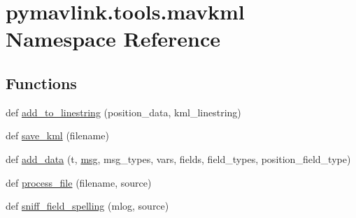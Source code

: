 \hypertarget{namespacepymavlink_1_1tools_1_1mavkml}{}\section{pymavlink.\+tools.\+mavkml Namespace Reference}
\label{namespacepymavlink_1_1tools_1_1mavkml}
\subsection*{Functions}
\begin{DoxyCompactItemize}
\item 
def \mbox{\hyperlink{namespacepymavlink_1_1tools_1_1mavkml_abf0b47cf026ca292449dfdc677ca6fd0}{add\+\_\+to\+\_\+linestring}} (position\+\_\+data, kml\+\_\+linestring)
\item 
def \mbox{\hyperlink{namespacepymavlink_1_1tools_1_1mavkml_a7ec121b5d220429cb465ea4f5a867b05}{save\+\_\+kml}} (filename)
\item 
def \mbox{\hyperlink{namespacepymavlink_1_1tools_1_1mavkml_a356af6d8a50929dbc97b578a26b02c89}{add\+\_\+data}} (t, \mbox{\hyperlink{stratnode_8cpp_a82cfe4ed9bc9e1b07c8bf209c324d85b}{msg}}, msg\+\_\+types, vars, fields, field\+\_\+types, position\+\_\+field\+\_\+type)
\item 
def \mbox{\hyperlink{namespacepymavlink_1_1tools_1_1mavkml_ad58bf3cda161593500630a9c8f812612}{process\+\_\+file}} (filename, source)
\item 
def \mbox{\hyperlink{namespacepymavlink_1_1tools_1_1mavkml_a8ad19bfa7dde8905f7ad26695e780678}{sniff\+\_\+field\+\_\+spelling}} (mlog, source)
\end{DoxyCompactItemize}
